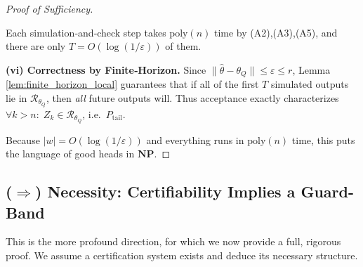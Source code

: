 \documentclass[12pt]{article}
\theoremstyle{definition}
\theoremstyle{plain}
\begin{document}
\begin{proof}[Proof of Sufficiency]
\begin{enumerate}
\end{enumerate}
Each simulation‐and‐check step takes \(\mathrm{poly}(n)\) time by (A2),(A3),(A5), and there are only \(T=O(\log(1/\varepsilon))\) of them.

\medskip\noindent
\textbf{(vi) Correctness by Finite‐Horizon.}  
Since \(\|\widehat\theta-\theta_Q\|\le\varepsilon\le r\), Lemma \ref{lem:finite_horizon_local} guarantees that if all of the first \(T\) simulated outputs lie in \(\mathcal R_{\theta_Q}\), then \emph{all} future outputs will.  Thus acceptance exactly characterizes
\(\forall k>n:\;Z_k\in\mathcal R_{\theta_Q}\), i.e.\ \(P_{\mathrm{tail}}\).

\vspace{1ex}
\noindent
Because \(\lvert w\rvert=O(\log(1/\varepsilon))\) and everything runs in \(\mathrm{poly}(n)\) time, this puts the language of good heads in \(\mathbf{NP}\).  
\end{proof}

\subsection{($\Rightarrow$) Necessity: Certifiability Implies a Guard-Band}
This is the more profound direction, for which we now provide a full, rigorous proof. We assume a certification system exists and deduce its necessary structure.
\end{document}
